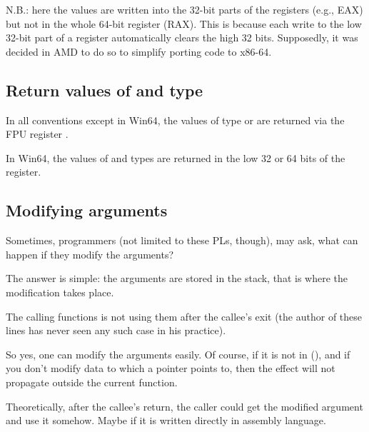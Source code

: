 


N.B.: here the values are written into the 32-bit parts of the registers (e.g., EAX) but not in the whole 64-bit 
register (RAX).
This is because each write to the low 32-bit part of a register automatically clears the high 32 bits.
Supposedly, it was decided in AMD to do so to simplify porting code to x86-64.

\subsection{Return values of \Tfloat and \Tdouble type}

In all conventions except in Win64, the values of type \Tfloat or \Tdouble are returned via the FPU register .

In Win64, the values of \Tfloat and \Tdouble types are returned 
in the low 32 or 64 bits of the  register.

\subsection{Modifying arguments}

Sometimes, \CCpp{} programmers (not limited to these \ac{PL}s, though),
may ask, what can happen if they modify the arguments?

The answer is simple: the arguments are stored in the stack, 
that is where the modification takes place.

The calling functions is not using them after the \gls{callee}'s exit (the author of these lines has never seen any such case in his practice).






So yes, one can modify the arguments easily.
Of course, if it is not  in \Cpp{} (),
and if you don't modify data to which a pointer points to, 
then the effect will not propagate outside the current function.

Theoretically, after the \gls{callee}'s return, 
the \gls{caller} could get the modified argument and use it somehow.
Maybe if it is written directly in assembly language.

